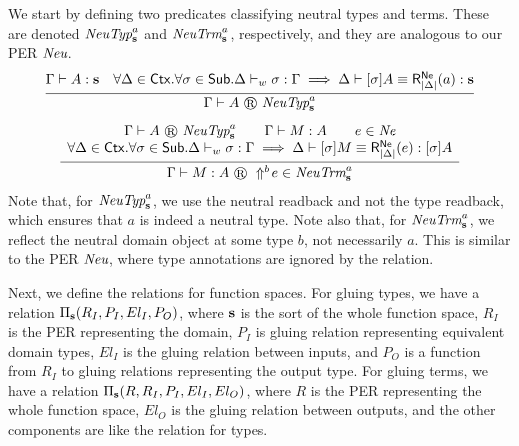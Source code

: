 We start by defining two predicates classifying neutral types and terms.
These are denoted $\gluneutp a$ and $\gluneutm a$, respectively, and they are analogous to our \ac{PER} ${\normalfont\textit{Neu}}$.
\[
\begin{array}{c}
  \infer{
    \glutpjudg \Gamma A {\gluneutp a}
  }{
    \wfexp \Gamma A {\tmcst s}
    &
    \forall \Delta \in \Ctx. \forall \sigma \in \Sub. \wfwk \Delta \sigma \Gamma \implies \eqexp \Delta {\tmclo \sigma A} {\rbnefunc[|\Delta|] a} {\tmcst s}
  }
  \\[8pt]
  \infer{
    \glutmjudg \Gamma M A {\dreflect b e} {\gluneutm a}
  }{
    \begin{array}{c}
      \glutpjudg \Gamma A {\gluneutp a}
      \qquad
      \wfexp \Gamma M A
      \qquad
      e \in \perne
      \\
      \forall \Delta \in \Ctx. \forall \sigma \in \Sub. \wfwk \Delta \sigma \Gamma \implies \eqexp \Delta {\tmclo \sigma M} {\rbnefunc[|\Delta|] e} {\tmclo \sigma A}
    \end{array}
  }
\end{array}
\]
Note that, for $\gluneutp a$, we use the neutral readback and not the type readback, which ensures that $a$ is indeed a neutral type.
Note also that, for $\gluneutm a$, we reflect the neutral domain object at some type $b$, not necessarily $a$.
This is similar to the \ac{PER} ${\normalfont\textit{Neu}}$, where type annotations are ignored by the relation.

Next, we define the relations for function spaces.
For gluing types, we have a relation $\glupitp {R_I} {P_I} {El_I} {P_O}$, where $\textbf{s}$ is the sort of the whole function space, $R_I$ is the \ac{PER} representing the domain, $P_I$ is gluing relation representing equivalent domain types, $El_I$ is the gluing relation between inputs, and $P_O$ is a function from $R_I$ to gluing relations representing the output type.
For gluing terms, we have a relation $\glupitm R {R_I} {P_I} {El_I} {El_O}$, where $R$ is the PER representing the whole function space, $El_O$ is the gluing relation between outputs, and the other components are like the relation for types.

